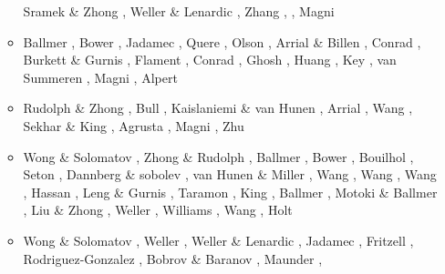 \begin{itemize}
\begin{scriptsize}
\begin{itemize}
                    Sramek \& Zhong \cite{srzh12}, Weller \& Lenardic \cite{wele12},
                    Zhang \etal \cite{zhzf12}, \cite{zams12},
                    Magni \etal \cite{mavf12}
\item[\twothousandthirteen] Ballmer \etal \cite{bacs13}, Bower \etal \cite{bogs13a,bogs13b},
                            Jadamec \etal \cite{jabr13}, Quere \etal \cite{qula13},
                            Olson \etal \cite{oldh13}, Arrial \& Billen \cite{arbi13},
                            Conrad \etal \cite{cost13}, Burkett \& Gurnis \cite{bugu13},
                            Flament \etal \cite{flgm13}, Conrad \cite{conr13},
                            Ghosh \etal \cite{ghbh13}, Huang \etal \cite{huyz13},
                            Key \etal \cite{kecl13}, van Summeren \etal \cite{vagc13},
                            Magni \etal \cite{mafv13}, Alpert \etal \cite{almb13}
\item[\twothousandfourteen] Rudolph \& Zhong \cite{ruzh14}, \cite{flgw14}
                            Bull \etal \cite{budt14}, Kaislaniemi \& van Hunen \cite{kava14},
                            Arrial \etal \cite{arfw14}, Wang \etal \cite{wavp14},
                            Sekhar \& King \cite{seki14}, Agrusta \etal \cite{agvg14},
                            Magni \etal \cite{mabv14}, Zhu \cite{zhu14}
\item[\twothousandfifteen] Wong \& Solomatov \cite{woso15}, Zhong \& Rudolph \cite{zhru15}, 
                    Ballmer \etal \cite{bacs15}, Bower \etal \cite{bogf15},
                    Bouilhol \etal \cite{bomv15}, Seton \etal \cite{sefw15},
                    Dannberg \& sobolev \cite{daso15}, van Hunen \& Miller \cite{vami15},
                    Wang \etal \cite{wazh15}, Wang \etal \cite{wavp15},
                    Wang \etal \cite{waav15}, Hassan \etal \cite{hafg15},
                    Leng \& Gurnis \cite{legu15}, Taramon \etal \cite{tarn15}, 
                    King \cite{king15},
                    Ballmer \etal \cite{basn15}, Motoki \& Ballmer \cite{moba15},
                    Liu \& Zhong \cite{lizh15}, Weller \etal \cite{welo15},
                    Williams \etal \cite{wilm15}, Wang \etal \cite{wahz15},
                    Holt \etal \cite{hobb15}
\item[\twothousandsixteen] Wong \& Solomatov \cite{woso16a,woso16b}, Weller \etal \cite{welm16},
                    Weller \& Lenardic \cite{wele16}, Jadamec \cite{jada16,jada16b},
                    Fritzell \etal \cite{frbs16}, Rodriguez-Gonzalez \etal \cite{robn16},
                    Bobrov \& Baranov \cite{boba16}, Maunder \etal \cite{mavm16},

\end{itemize}
\end{scriptsize}
\end{itemize}
